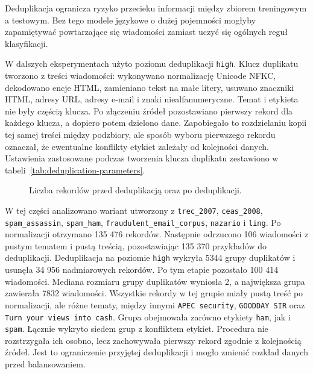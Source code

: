 Deduplikacja ogranicza ryzyko przecieku informacji między zbiorem treningowym a
testowym. Bez tego modele językowe o dużej pojemności mogłyby zapamiętywać
powtarzające się wiadomości zamiast uczyć się ogólnych reguł klasyfikacji.

W dalszych eksperymentach użyto poziomu deduplikacji \texttt{high}. Klucz
duplikatu tworzono z treści wiadomości: wykonywano normalizację Unicode NFKC,
dekodowano encje HTML, zamieniano tekst na małe litery, usuwano znaczniki HTML,
adresy URL, adresy e-mail i znaki niealfanumeryczne. Temat i etykieta nie były
częścią klucza. Po złączeniu źródeł pozostawiano pierwszy rekord dla każdego
klucza, a dopiero potem dzielono dane. Zapobiegało to rozdzielaniu kopii tej
samej treści między podzbiory, ale sposób wyboru pierwszego rekordu oznaczał,
że ewentualne konflikty etykiet zależały od kolejności danych.
Ustawienia zastosowane podczas tworzenia klucza duplikatu zestawiono w
tabeli~\ref{tab:deduplication-parameters}.

\begin{table}[htbp]
\centering
\small

\caption{Parametry deduplikacji na poziomie \texttt{high}.}
\label{tab:deduplication-parameters}
\end{table}

\begin{figure}[htbp]
\centering

\caption{Liczba rekordów przed deduplikacją oraz po deduplikacji.}
\label{fig:deduplication-sample-counts}
\end{figure}


W tej części analizowano wariant utworzony z \texttt{trec\_2007},
\texttt{ceas\_2008}, \texttt{spam\_assassin}, \texttt{spam\_ham},
\texttt{fraudulent\_email\_corpus}, \texttt{nazario} i \texttt{ling}. Po normalizacji
otrzymano 135 476 rekordów. Następnie odrzucono 106 wiadomości z pustym
tematem i pustą treścią, pozostawiając 135 370 przykładów do deduplikacji.
Deduplikacja na poziomie \texttt{high} wykryła 5344 grupy duplikatów i usunęła
34 956 nadmiarowych rekordów. Po tym etapie pozostało 100 414 wiadomości. Mediana
rozmiaru grupy duplikatów wyniosła 2, a największa grupa zawierała 7832
wiadomości. Wszystkie rekordy w tej grupie miały pustą treść po normalizacji,
ale różne tematy, między innymi \texttt{APEC security},
\texttt{GOODDAY SIR} oraz \texttt{Turn your views into cash}. Grupa obejmowała
zarówno etykiety \texttt{ham}, jak i \texttt{spam}. Łącznie wykryto siedem grup
z konfliktem etykiet. Procedura nie rozstrzygała ich osobno, lecz zachowywała
pierwszy rekord zgodnie z kolejnością źródeł. Jest to ograniczenie przyjętej
deduplikacji i mogło zmienić rozkład danych przed balansowaniem.

